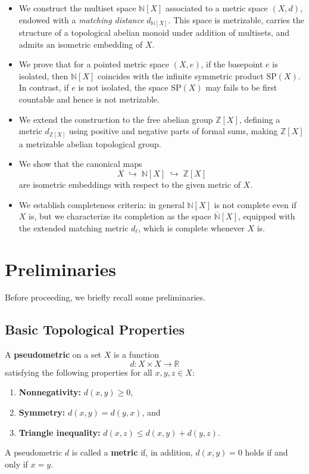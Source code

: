 \documentclass[10pt,a4paper]{article}
\theoremstyle{definition}
\newcommand{\SP}{\mathrm{SP}}
\newcommand{\Z}{\mathbb{Z}}
\newcommand{\N}{\mathbb{N}}
\begin{document}
\begin{itemize}
  \item We construct the multiset space $\N[X]$ associated to a metric space
    $(X,d)$, endowed with a \emph{matching distance} $d_{\N[X]}$.
    This space is metrizable, carries the structure of a topological abelian
    monoid under addition of multisets, and admits an isometric embedding
    of $X$.
  \item We prove that for a pointed metric space $(X,e)$, if the basepoint $e$ is
    isolated, then $\N[X]$ coincides with the infinite symmetric product $\SP(X)$.
    In contrast, if $e$ is not isolated, the space $\SP(X)$ may fails to be first
    countable and hence is not metrizable.
  \item We extend the construction to the free abelian group $\Z[X]$,
    defining a metric $d_{\Z[X]}$ using positive and negative parts of formal
    sums, making
    $\Z[X]$ a metrizable abelian topological group.
  \item We show that the canonical maps
    \[
      X \;\hookrightarrow\; \N[X] \;\hookrightarrow\; \Z[X]
    \]
    are isometric embeddings with respect to the given metric of $X$.
  \item We establish completeness criteria: in general $\N[X]$ is not complete
    even if $X$ is, but we characterize its completion as the space
    $\overline{\N}[X]$, equipped with the
    extended matching metric $d_\ell$, which is complete whenever $X$ is.
\end{itemize}







\section{Preliminaries}\label{sec:prelim}
Before proceeding, we briefly recall some preliminaries.

\subsection{Basic Topological Properties}
A \textbf{pseudometric} on a set $X$ is a function
\[
d \colon X \times X \to \mathbb{R}
\]
satisfying the following properties for all $x,y,z \in X$:
\begin{enumerate}[label=(\roman*)]
    \item \textbf{Nonnegativity:} $d(x,y) \ge 0$,
    \item \textbf{Symmetry:} $d(x,y)=d(y,x)$, and
    \item  \textbf{Triangle inequality:} $d(x,z) \le d(x,y)+d(y,z)$.
\end{enumerate}
A pseudometric $d$ is called a \textbf{metric} if, in addition,
$d(x,y)=0$ holds if and only if $x=y$.
\end{document}

